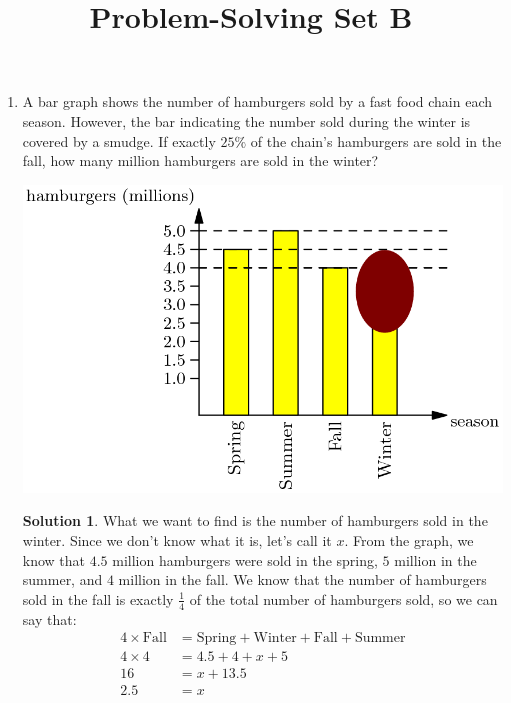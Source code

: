 \documentclass{article}
\title{Problem-Solving Set B}
\author{}
\date{}
\theoremstyle{definition}
\newtheorem*{solution}{Solution}
\begin{document}
\maketitle
\begin{multicols*}{2}
    \begin{enumerate}
        \item A bar graph shows the number of hamburgers sold by a fast food chain each season.
            However, the bar indicating the number sold during the winter is covered by a smudge.
            If exactly $25\%$ of the chain's hamburgers are sold in the fall, how many million hamburgers are sold in the winter?
            \begin{center}
                \includegraphics[scale=0.2]{5-2_bar_graph.png}
            \end{center}
            \begin{solution}
                What we want to find is the number of hamburgers sold in the winter.
                Since we don't know what it is, let's call it $x$.
				From the graph, we know that $4.5$ million hamburgers were sold in the spring, $5$ million in the summer, and $4$ million in the fall.
                We know that the number of hamburgers sold in the fall is exactly $\frac{1}{4}$ of the total number of hamburgers sold, so we can say that:
                \begin{align*}
                    4 \times \text{Fall} &= \text{Spring} + \text{Winter} + \text{Fall} + \text{Summer} \\
                    4 \times 4 &= 4.5 + 4 + x + 5 \\
                    16 &= x + 13.5 \\
                    2.5 &= x
                \end{align*}

\end{solution}
\end{enumerate}
\end{multicols*}
\end{document}

